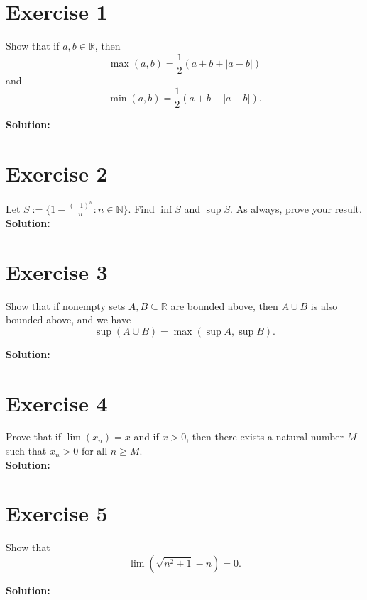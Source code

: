 \documentclass{article}
\begin{document}
\section*{Exercise 1}
Show that if $a, b \in \mathbb{R}$, then
\[\max(a,b) = \frac{1}{2}(a + b + |a-b|)\]
and
\[\min(a,b) = \frac{1}{2}(a + b - |a-b|).\]

\textbf{Solution:} \\



\newpage

\section*{Exercise 2}
Let $S := \{1-\frac{(-1)^n}{n} : n \in \mathbb{N}\}$. Find $\inf S$ and $\sup S$. As always, prove your result. \\

\textbf{Solution:} \\



\newpage

\section*{Exercise 3}
Show that if nonempty sets $A, B \subseteq \mathbb{R}$ are bounded above, then $A \cup B$ is also bounded above, and we have
\[\sup(A \cup B) = \max(\sup A, \sup B).\]

\textbf{Solution:} \\



\newpage

\section*{Exercise 4}
Prove that if $\lim(x_n) = x$ and if $x > 0$, then there exists a natural number $M$ such that $x_n > 0$ for all $n \geq M$. \\

\textbf{Solution:} \\



\newpage

\section*{Exercise 5}
Show that
\[\lim\left(\sqrt{n^2 + 1} - n\right) = 0.\]

\textbf{Solution:} \\
\end{document}
